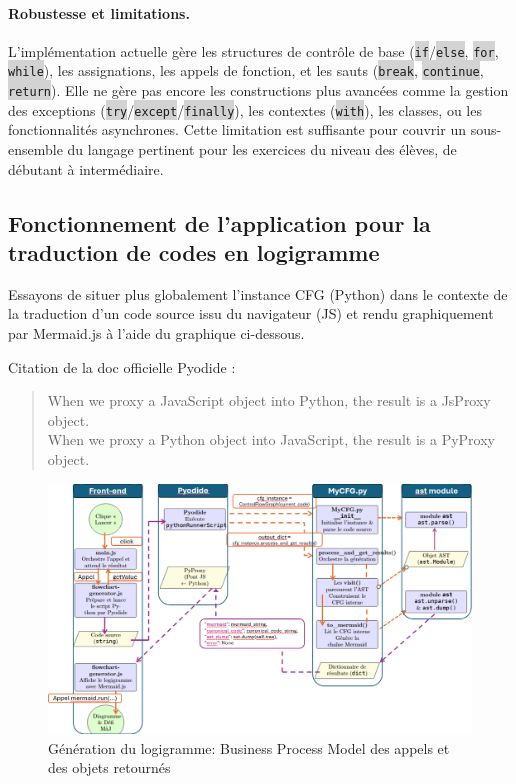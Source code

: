 \documentclass[11pt,a4paper]{article}
\newcommand{\code}[1]{\colorbox{lightgray}{\texttt{\small #1}}}
\begin{document}
\paragraph{Robustesse et limitations.} L'implémentation actuelle gère les structures de contrôle de base (\code{if}/\code{else}, \code{for}, \code{while}), les assignations, les appels de fonction, et les sauts (\code{break}, \code{continue}, \code{return}). Elle ne gère pas encore les constructions plus avancées comme la gestion des exceptions (\code{try}/\code{except}/\code{finally}), les contextes (\code{with}), les classes, ou les fonctionnalités asynchrones. Cette limitation est suffisante pour couvrir un sous-ensemble du langage pertinent pour les exercices du niveau des élèves, de débutant à intermédiaire.

\subsection{Fonctionnement de l'application pour la traduction de codes en logigramme}

Essayons de situer plus globalement l'instance CFG (Python) dans le contexte de la traduction d'un code source issu du navigateur (JS) et rendu graphiquement par Mermaid.js à l'aide du graphique ci-dessous.

Citation de la doc officielle Pyodide \cite{pyodide}:
\begin{quote}
    When we proxy a JavaScript object into Python, the result is a JsProxy object.\\ When we proxy a Python object into JavaScript, the result is a PyProxy object.
\end{quote}

\begin{landscape}
\begin{figure}
    \centering
    \includegraphics[width=1.3\textwidth]{BPMN_process_logigramme.png}
    \caption{Génération du logigramme: Business Process Model des appels et des objets retournés}
    \label{bpmn}
\end{figure}
\end{landscape}
\end{document}
